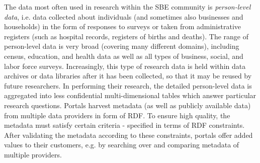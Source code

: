 \documentclass{llncs}
\begin{document}
The data most often used in research within the SBE community is \emph{person-level data}, i.e. data collected about individuals 
(and sometimes also businesses and households) in the form of responses to surveys or taken from administrative registers
(such as hospital records, registers of births and deaths). 
The range of person-level data is very broad (covering many different domains), 
including census, education, and health data as well as all types of business, social, and labor force surveys.  
Increasingly, this type of research data is
held within data archives or data libraries after it has been collected, so that it may be
reused by future researchers. 
In performing their research, the detailed person-level
data is aggregated into less confidential multi-dimensional tables which answer particular research questions.
Portals harvest metadata (as well as publicly available data) from multiple data providers in form of RDF.
To ensure high quality, the metadata must satisfy certain criteria - specified in terms of RDF constraints.  
After validating the metadata according to these constraints, portals offer added values to their customers, e.g. by searching over and comparing metadata of multiple providers. 
\end{document}

